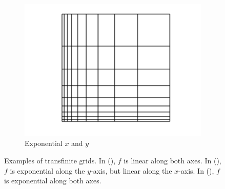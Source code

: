 \begin{figure}[ht]
\begin{subfigure}[b]{0.32\textwidth}
        \centering
        \includegraphics[width=\textwidth]{report/Images/Theory/transfinite/transfinite_3.png}
        \caption{Exponential $x$ and $y$}
        \label{fig:trans3}
    \end{subfigure}
    \caption[Examples of transfinite grids]{Examples of transfinite grids. In (), $f$ is linear along both axes. In (), $f$ is exponential along the $y$-axis, but linear along the $x$-axis. In (), $f$ is exponential along both axes.}
    \label{fig:transfinite}
\end{figure}